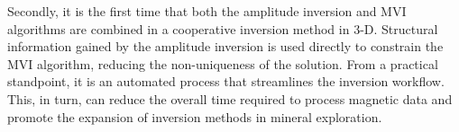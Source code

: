 Secondly, it is the first time that both the amplitude inversion and MVI algorithms are combined in a cooperative inversion method in 3-D.
Structural information gained by the amplitude inversion is used directly to constrain the MVI algorithm, reducing the non-uniqueness of the solution.
From a practical standpoint, it is an automated process that streamlines the inversion workflow.
This, in turn, can reduce the overall time required to process magnetic data and promote the expansion of inversion methods in mineral exploration.

\endinput

